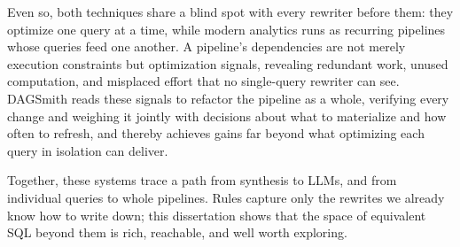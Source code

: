 Even so, both techniques share a blind spot with every rewriter before them: they optimize one query at a time, while modern analytics runs as recurring pipelines whose queries feed one another. A pipeline's dependencies are not merely execution constraints but optimization signals, revealing redundant work, unused computation, and misplaced effort that no single-query rewriter can see. DAGSmith reads these signals to refactor the pipeline as a whole, verifying every change and weighing it jointly with decisions about what to materialize and how often to refresh, and thereby achieves gains far beyond what optimizing each query in isolation can deliver.

Together, these systems trace a path from synthesis to LLMs, and from individual queries to whole pipelines. Rules capture only the rewrites we already know how to write down; this dissertation shows that the space of equivalent SQL beyond them is rich, reachable, and well worth exploring.



